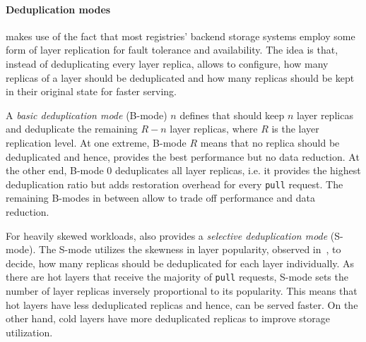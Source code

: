 \paragraph{Deduplication modes}

\sysname makes use of the fact that most registries' backend storage systems employ some form of layer replication
for fault tolerance and availability. The idea is that, instead of deduplicating every layer replica,
\sysname allows to configure, how many replicas of a layer should be deduplicated and
how many replicas should be kept in their original state for faster serving.

A \emph{basic deduplication mode} (B-mode) $n$ defines that \sysname should keep $n$ layer
replicas and deduplicate the remaining $R-n$ layer replicas, where $R$ is the
layer replication level.
%
%
At one extreme, B-mode $R$ means that no replica should be deduplicated and hence, provides the best
performance but no data reduction. At the other end, B-mode $0$ deduplicates all layer replicas, i.e. it
provides the highest deduplication ratio but adds restoration overhead for every \texttt{pull} request.
The remaining B-modes in between allow to trade off performance and data reduction.

For heavily skewed workloads, \sysname also provides a \emph{selective deduplication mode} (S-mode). The
S-mode utilizes the skewness in layer popularity, observed in~\cite{dockerworkload}, to decide, how many
replicas should be deduplicated for each layer individually. As there are hot layers that receive the
majority of \texttt{pull} requests, S-mode sets the number of layer replicas inversely proportional to
its popularity. This means that hot layers have less deduplicated replicas and hence, can be served
faster. On the other hand, cold layers have more deduplicated replicas to improve storage utilization.
%

